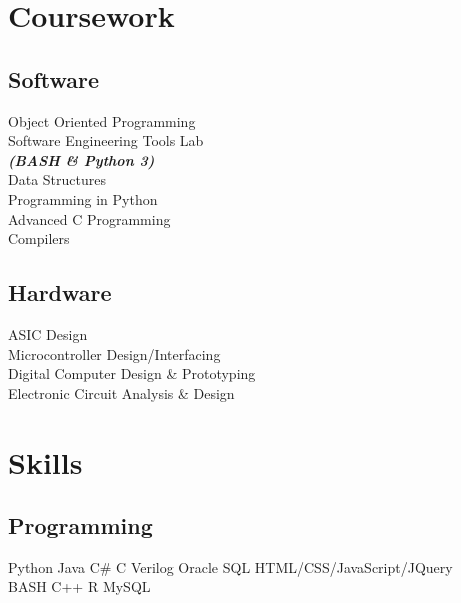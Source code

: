 \documentclass[letterpaper]{deedy-resume} %
\begin{document}
\begin{minipage}[t]{0.33\textwidth}
\section{Coursework}



\subsection{Software}

Object Oriented Programming \\
Software Engineering Tools Lab \\
{\footnotesize \textit{\textbf{(BASH \& Python 3) }}} \\
Data Structures \\
Programming in Python \\
Advanced C Programming \\
Compilers \\
\sectionspace
\subsection{Hardware}
ASIC Design \\
Microcontroller Design/Interfacing \\
Digital Computer Design \& Prototyping \\
Electronic Circuit Analysis \& Design \\

\sectionspace %


\section{Skills}

\subsection{Programming}

Python \textbullet{} Java \textbullet{} C\# \textbullet{} C \textbullet{} Verilog \textbullet{} Oracle SQL \textbullet{} HTML/CSS/JavaScript/JQuery \textbullet{} \\
BASH \textbullet{} C++ \textbullet{} R \textbullet{} MySQL \textbullet{}\\
\sectionspace


\end{minipage}
\end{document}
